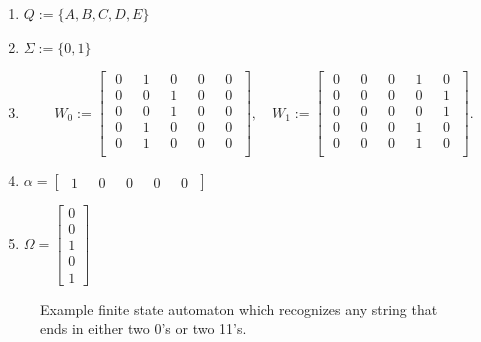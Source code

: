 \documentclass[12pt]{amsbook}
\theoremstyle{plain}
\theoremstyle{definition}
\theoremstyle{remark}
\begin{document}
\begin{enumerate}
\item $Q:=\{A,B,C,D,E\}$
\item $\Sigma:=\{0,1\}$
\item
$$W_0:=
\begin{bmatrix}
\,\,0\,\,&\,\,1\,\,&\,\,0\,\,&\,\,0\,\,&\,\,0\,\,\\
\,\,0\,\,&\,\,0\,\,&\,\,1\,\,&\,\,0\,\,&\,\,0\,\,\\
\,\,0\,\,&\,\,0\,\,&\,\,1\,\,&\,\,0\,\,&\,\,0\,\,\\
\,\,0\,\,&\,\,1\,\,&\,\,0\,\,&\,\,0\,\,&\,\,0\,\,\\
\,\,0\,\,&\,\,1\,\,&\,\,0\,\,&\,\,0\,\,&\,\,0\,\,\\
\end{bmatrix},\quad W_1:=
\begin{bmatrix}
\,\,0\,\,&\,\,0\,\,&\,\,0\,\,&\,\,1\,\,&\,\,0\,\,\\
\,\,0\,\,&\,\,0\,\,&\,\,0\,\,&\,\,0\,\,&\,\,1\,\,\\
\,\,0\,\,&\,\,0\,\,&\,\,0\,\,&\,\,0\,\,&\,\,1\,\,\\
\,\,0\,\,&\,\,0\,\,&\,\,0\,\,&\,\,1\,\,&\,\,0\,\,\\
\,\,0\,\,&\,\,0\,\,&\,\,0\,\,&\,\,1\,\,&\,\,0\,\,\\
\end{bmatrix}.$$
\item $\alpha = \begin{bmatrix}\,\,1\,\,&\,\,0\,\,&\,\,0\,\,&\,\,0\,\,&\,\,0\,\,\end{bmatrix}$
\item $\Omega = \begin{bmatrix}0\\0\\1\\0\\1\end{bmatrix}$
\end{enumerate}

\begin{figure}
\caption{Example finite state automaton which recognizes any string that ends in either two 0's or two 11's. \label{fig:automaton1}}
\end{figure}
\end{document}
